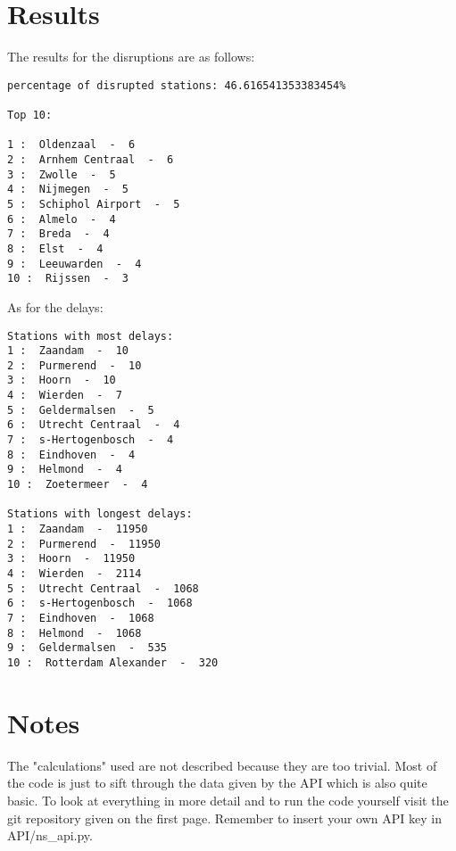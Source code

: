 \documentclass[a4paper, 12pt, one column]{article}
\begin{document}
\section{Results}
The results for the disruptions are as follows:
\begin{lstlisting}
percentage of disrupted stations: 46.616541353383454%

Top 10:

1 :  Oldenzaal  -  6
2 :  Arnhem Centraal  -  6
3 :  Zwolle  -  5
4 :  Nijmegen  -  5
5 :  Schiphol Airport  -  5
6 :  Almelo  -  4
7 :  Breda  -  4
8 :  Elst  -  4
9 :  Leeuwarden  -  4
10 :  Rijssen  -  3
\end{lstlisting}
As for the delays:
\begin{lstlisting}
Stations with most delays:
1 :  Zaandam  -  10
2 :  Purmerend  -  10
3 :  Hoorn  -  10
4 :  Wierden  -  7
5 :  Geldermalsen  -  5
6 :  Utrecht Centraal  -  4
7 :  s-Hertogenbosch  -  4
8 :  Eindhoven  -  4
9 :  Helmond  -  4
10 :  Zoetermeer  -  4

Stations with longest delays:
1 :  Zaandam  -  11950
2 :  Purmerend  -  11950
3 :  Hoorn  -  11950
4 :  Wierden  -  2114
5 :  Utrecht Centraal  -  1068
6 :  s-Hertogenbosch  -  1068
7 :  Eindhoven  -  1068
8 :  Helmond  -  1068
9 :  Geldermalsen  -  535
10 :  Rotterdam Alexander  -  320
\end{lstlisting}
\section{Notes}
The "calculations" used are not described because they are too trivial. Most of the code is just to sift through the data given by the API which is also quite basic. To look at everything in more detail and to run the code yourself visit the git repository given on the first page. Remember to insert your own API key in API/ns\_api.py.
\end{document}

